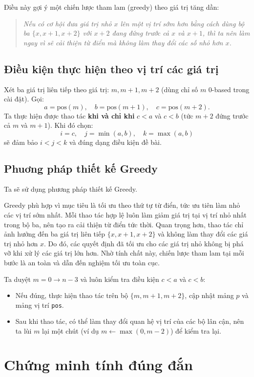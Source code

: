 \documentclass[12pt,a4paper]{article}
\begin{document}
Điều này gợi ý một chiến lược tham lam (greedy) theo giá trị tăng dần:
\begin{quote}
\textit{Nếu có cơ hội đưa giá trị nhỏ $x$ lên một vị trí sớm hơn bằng cách dùng bộ ba $\{x,x+1,x+2\}$ với $x+2$ đang đứng trước cả $x$ và $x+1$, thì ta nên làm ngay vì sẽ cải thiện từ điển mà không làm thay đổi các số nhỏ hơn $x$.}
\end{quote}

\subsection*{Điều kiện thực hiện theo vị trí các giá trị}
Xét ba giá trị liên tiếp theo giá trị: $m, m{+}1, m{+}2$ (dùng chỉ số $m$ 0-based trong cài đặt).
Gọi:
\[
a=\text{pos}(m),\quad b=\text{pos}(m{+}1),\quad c=\text{pos}(m{+}2).
\]
Ta thực hiện được thao tác \textbf{khi và chỉ khi} $c<a$ và $c<b$ (tức $m{+}2$ đứng trước cả $m$ và $m{+}1$).
Khi đó chọn:
\[
i=c,\quad j=\min(a,b),\quad k=\max(a,b)
\]
sẽ đảm bảo $i<j<k$ và đúng dạng điều kiện đề bài.

\subsection*{Phuơng pháp thiết kế Greedy}
Ta sẽ sử dụng phương pháp thiết kế Greedy. 

Greedy phù hợp vì mục tiêu là tối ưu theo thứ tự từ điển, tức ưu tiên làm nhỏ các vị trí sớm nhất. Mỗi thao tác hợp lệ luôn làm giảm giá trị tại vị trí nhỏ nhất trong bộ ba, nên tạo ra cải thiện từ điển tức thời. Quan trọng hơn, thao tác chỉ ảnh hưởng đến ba giá trị liên tiếp $\{x, x+1, x+2\}$ và không làm thay
đổi các giá trị nhỏ hơn $x$. Do đó, các quyết định đã tối ưu cho các giá trị nhỏ không bị phá vỡ khi xử lý các giá trị lớn hơn. Nhờ tính chất này, chiến lược tham lam tại mỗi bước là an toàn và dẫn đến nghiệm tối ưu toàn cục.


Ta duyệt $m=0 \to n-3$ và luôn kiểm tra điều kiện $c<a$ và $c<b$:
\begin{itemize}[nosep]
	\item Nếu đúng, thực hiện thao tác trên bộ $\{m,m{+}1,m{+}2\}$, cập nhật mảng $p$ và mảng vị trí \texttt{pos}.
	\item Sau khi thao tác, có thể làm thay đổi quan hệ vị trí của các bộ lân cận, nên ta lùi $m$ lại một chút (ví dụ $m \leftarrow \max(0, m-2)$) để kiểm tra lại.
\end{itemize}


\section{Chứng minh tính đúng đắn}
\end{document}
